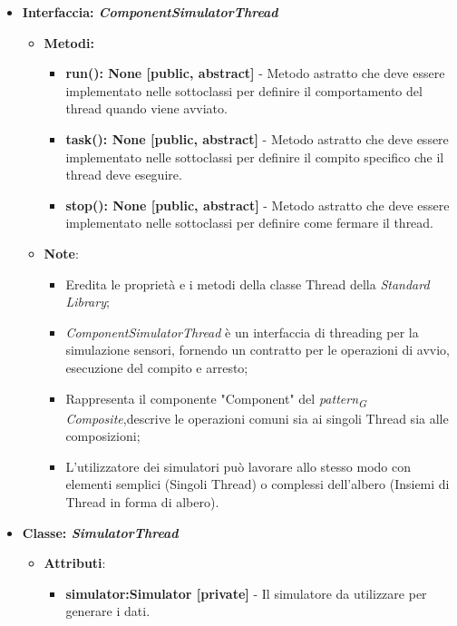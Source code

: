 \begin{itemize}
\begin{itemize}
 \item{\textbf{Interfaccia: \textit{ComponentSimulatorThread}}}
    \begin{itemize}
        \item \textbf{Metodi: }
        \begin{itemize}
            \item \textbf{run(): None [public, abstract]} - Metodo astratto che deve essere implementato nelle sottoclassi per definire il comportamento del thread quando viene avviato.
            \item \textbf{task(): None [public, abstract]} - Metodo astratto che deve essere implementato nelle sottoclassi per definire il compito specifico che il thread deve eseguire.
            \item \textbf{stop(): None [public, abstract]} - Metodo astratto che deve essere implementato nelle sottoclassi per definire come fermare il thread.
        \end{itemize}
        \item\textbf{Note}:
            \begin{itemize}
                \item Eredita le proprietà e i metodi della classe Thread della \textit{Standard Library};
                \item \textit{ComponentSimulatorThread} è un interfaccia di threading per la simulazione sensori, fornendo un contratto per le operazioni di avvio, esecuzione del compito e arresto;
                \item Rappresenta il componente "Component" del \textit{pattern}\textsubscript{\textit{G}} \textit{Composite},descrive le operazioni comuni sia ai singoli Thread sia alle composizioni;
                \item L'utilizzatore dei simulatori può lavorare allo stesso modo con elementi semplici (Singoli Thread) o complessi dell'albero (Insiemi di Thread in forma di albero).
            \end{itemize}
    \end{itemize}
    \item{\textbf{Classe: \textit{SimulatorThread}}}
    \begin{itemize}
    \item\textbf{Attributi}:
        \begin{itemize}
        \item \textbf{simulator:Simulator [private]} - Il simulatore da utilizzare per generare i dati.

\end{itemize}
\end{itemize}
\end{itemize}
\end{itemize}
